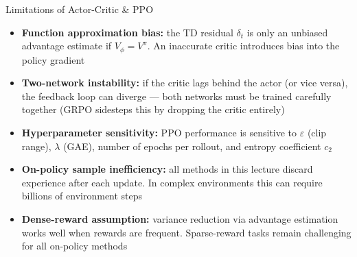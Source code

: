 \begin{frame}{Limitations of Actor-Critic \& PPO}
\begin{itemize}
    \item \textbf{Function approximation bias:} the TD residual $\delta_t$ is only an unbiased advantage estimate if $V_\phi = V^{\pi}$. An inaccurate critic introduces bias into the policy gradient
    \item \textbf{Two-network instability:} if the critic lags behind the actor (or vice versa), the feedback loop can diverge --- both networks must be trained carefully together (GRPO sidesteps this by dropping the critic entirely)
    \item \textbf{Hyperparameter sensitivity:} PPO performance is sensitive to $\varepsilon$ (clip range), $\lambda$ (GAE), number of epochs per rollout, and entropy coefficient $c_2$
    \item \textbf{On-policy sample inefficiency:} all methods in this lecture discard experience after each update. In complex environments this can require billions of environment steps
    \item \textbf{Dense-reward assumption:} variance reduction via advantage estimation works well when rewards are frequent. Sparse-reward tasks remain challenging for all on-policy methods
\end{itemize}
\end{frame}

